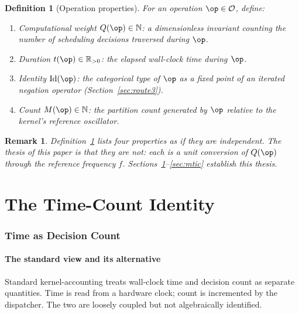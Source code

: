 \documentclass[twocolumn,11pt,a4paper]{article}
\newtheorem{definition}[theorem]{Definition}
\newtheorem{remark}[theorem]{Remark}
\newcommand{\Real}{\mathbb{R}}
\newcommand{\Natural}{\mathbb{N}}
\newcommand{\Op}{\mathcal{O}}
\newcommand{\Mcount}{M}
\newcommand{\Qweight}{Q}
\begin{document}
\begin{definition}[Operation properties]
\label{def:op-properties}
For an operation $\op \in \Op$, define:
\begin{enumerate}[nosep,label=(\roman*)]
\item \emph{Computational weight} $\Qweight(\op) \in \Natural$: a dimensionless invariant counting the number of scheduling decisions traversed during $\op$.
\item \emph{Duration} $t(\op) \in \Real_{> 0}$: the elapsed wall-clock time during $\op$.
\item \emph{Identity} $\mathrm{Id}(\op)$: the categorical type of $\op$ as a fixed point of an iterated negation operator (Section~\ref{sec:route3}).
\item \emph{Count} $\Mcount(\op) \in \Natural$: the partition count generated by $\op$ relative to the kernel's reference oscillator.
\end{enumerate}
\end{definition}

\begin{remark}
Definition~\ref{def:op-properties} lists four properties as if they are independent. The thesis of this paper is that they are not: each is a unit conversion of $\Qweight(\op)$ through the reference frequency $f$. Sections~\ref{sec:time-count}--\ref{sec:mtic} establish this thesis.
\end{remark}

\part{The Time-Count Identity}

\section{Time as Decision Count}
\label{sec:time-count}

\subsection{The standard view and its alternative}

Standard kernel-accounting treats wall-clock time and decision count as separate quantities. Time is read from a hardware clock; count is incremented by the dispatcher. The two are loosely coupled but not algebraically identified.
\end{document}

